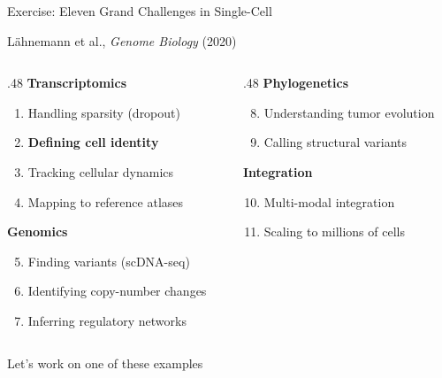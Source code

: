 \documentclass[
  12pt,
  ignorenonframetext,
  aspectratio=169]{beamer}
\providecommand{\tightlist}{%
  \setlength{\itemsep}{0pt}\setlength{\parskip}{0pt}}
\begin{document}
\begin{frame}{Exercise: Eleven Grand Challenges in Single-Cell}
\protect{}\label{exercise-eleven-grand-challenges-in-single-cell}
\footnotesize

Lähnemann et al., \emph{Genome Biology} (2020)

\normalsize

\begin{columns}[T]
\begin{column}{.48\linewidth}
\textbf{Transcriptomics}

\begin{enumerate}
\tightlist
\item
  Handling sparsity (dropout)
\item
  \textbf{\color{magenta} Defining cell identity}
\item
  Tracking cellular dynamics
\item
  Mapping to reference atlases
\end{enumerate}

\textbf{Genomics}

\begin{enumerate}
\setcounter{enumi}{4}
\tightlist
\item
  Finding variants (scDNA-seq)
\item
  Identifying copy-number changes
\item
  Inferring regulatory networks
\end{enumerate}
\end{column}

\begin{column}{.48\linewidth}
\textbf{Phylogenetics}

\begin{enumerate}
\setcounter{enumi}{7}
\tightlist
\item
  Understanding tumor evolution
\item
  Calling structural variants
\end{enumerate}

\textbf{Integration}

\begin{enumerate}
\setcounter{enumi}{9}
\tightlist
\item
  Multi-modal integration
\item
  Scaling to millions of cells
\end{enumerate}
\end{column}
\end{columns}

Let's work on one of these examples
\end{frame}
\end{document}
